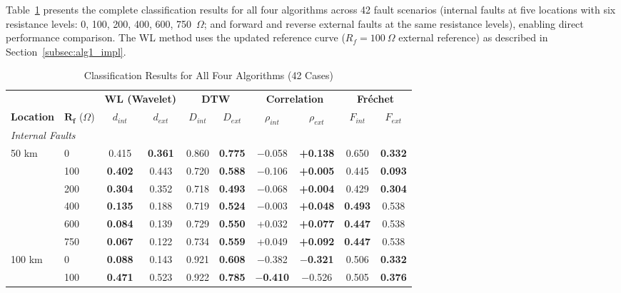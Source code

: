 \documentclass[journal]{IEEEtran}
\begin{document}
Table~\ref{tab:all_results} presents the complete classification results for all four algorithms across 42 fault scenarios (internal faults at five locations with six resistance levels: 0, 100, 200, 400, 600, 750~$\Omega$; and forward and reverse external faults at the same resistance levels), enabling direct performance comparison. The WL method uses the updated reference curve ($R_f = 100~\Omega$ external reference) as described in Section~\ref{subsec:alg1_impl}.

\begin{table}[!t]
\centering
\caption{Classification Results for All Four Algorithms (42 Cases)}
\label{tab:all_results}
\small
\begin{tabular}{@{}llcccccccc@{}}
\toprule
& & \multicolumn{2}{c}{\textbf{WL (Wavelet)}} & \multicolumn{2}{c}{\textbf{DTW}} & \multicolumn{2}{c}{\textbf{Correlation}} & \multicolumn{2}{c}{\textbf{Fréchet}} \\
\cmidrule(lr){3-4} \cmidrule(lr){5-6} \cmidrule(lr){7-8} \cmidrule(lr){9-10}
\textbf{Location} & $\mathbf{R_f}$ ($\Omega$) & $d_{int}$ & $d_{ext}$ & $D_{int}$ & $D_{ext}$ & $\rho_{int}$ & $\rho_{ext}$ & $F_{int}$ & $F_{ext}$ \\
\midrule
\multicolumn{10}{l}{\textit{Internal Faults}} \\
\midrule
50 km  & 0   & 0.415 & \textbf{0.361} & 0.860 & \textbf{0.775} & $-$0.058 & \textbf{+0.138} & 0.650 & \textbf{0.332} \\
       & 100 & \textbf{0.402} & 0.443 & 0.720 & \textbf{0.588} & $-$0.106 & \textbf{+0.005} & 0.445 & \textbf{0.093} \\
       & 200 & \textbf{0.304} & 0.352 & 0.718 & \textbf{0.493} & $-$0.068 & \textbf{+0.004} & 0.429 & \textbf{0.304} \\
       & 400 & \textbf{0.135} & 0.188 & 0.719 & \textbf{0.524} & $-$0.003 & \textbf{+0.048} & \textbf{0.493} & 0.538 \\
       & 600 & \textbf{0.084} & 0.139 & 0.729 & \textbf{0.550} & +0.032 & \textbf{+0.077} & \textbf{0.447} & 0.538 \\
       & 750 & \textbf{0.067} & 0.122 & 0.734 & \textbf{0.559} & +0.049 & \textbf{+0.092} & \textbf{0.447} & 0.538 \\
\cmidrule{1-10}
100 km & 0   & \textbf{0.088} & 0.143 & 0.921 & \textbf{0.608} & $-$0.382 & \textbf{$-$0.321} & 0.506 & \textbf{0.332} \\
       & 100 & \textbf{0.471} & 0.523 & 0.922 & \textbf{0.785} & \textbf{$-$0.410} & $-$0.526 & 0.505 & \textbf{0.376} \\

\end{tabular}
\end{table}
\end{document}
